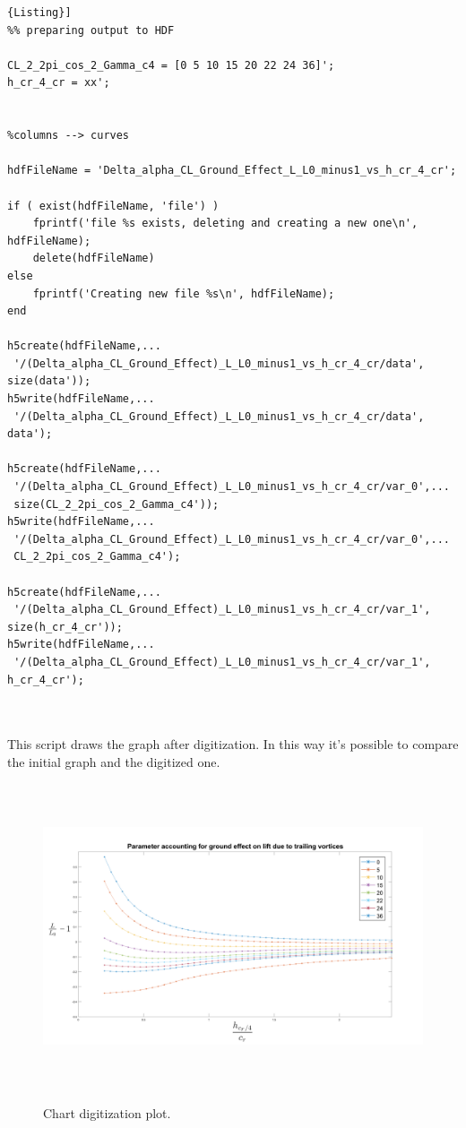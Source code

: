 \begin{lstlisting}[frame=rbl,caption={{\footnotesize MATLAB script for creating the HDF Database}},label= [style=\bfseries]{Listing}]
%% preparing output to HDF

CL_2_2pi_cos_2_Gamma_c4 = [0 5 10 15 20 22 24 36]';
h_cr_4_cr = xx';

 
%columns --> curves
 
hdfFileName = 'Delta_alpha_CL_Ground_Effect_L_L0_minus1_vs_h_cr_4_cr';

if ( exist(hdfFileName, 'file') )
    fprintf('file %s exists, deleting and creating a new one\n', hdfFileName);
    delete(hdfFileName)
else
    fprintf('Creating new file %s\n', hdfFileName);
end

h5create(hdfFileName,...
 '/(Delta_alpha_CL_Ground_Effect)_L_L0_minus1_vs_h_cr_4_cr/data', size(data'));
h5write(hdfFileName,...
 '/(Delta_alpha_CL_Ground_Effect)_L_L0_minus1_vs_h_cr_4_cr/data', data');

h5create(hdfFileName,...
 '/(Delta_alpha_CL_Ground_Effect)_L_L0_minus1_vs_h_cr_4_cr/var_0',...
 size(CL_2_2pi_cos_2_Gamma_c4'));
h5write(hdfFileName,...
 '/(Delta_alpha_CL_Ground_Effect)_L_L0_minus1_vs_h_cr_4_cr/var_0',...
 CL_2_2pi_cos_2_Gamma_c4');

h5create(hdfFileName,...
 '/(Delta_alpha_CL_Ground_Effect)_L_L0_minus1_vs_h_cr_4_cr/var_1', size(h_cr_4_cr'));
h5write(hdfFileName,...
 '/(Delta_alpha_CL_Ground_Effect)_L_L0_minus1_vs_h_cr_4_cr/var_1', h_cr_4_cr');
\end{lstlisting}

\noindent \\ \\ 
This script draws the graph after digitization. In this way it's possible to compare the initial graph and the digitized one.


 \begin{figure}[H]
\centering
{\includegraphics[height=9cm]{Immagini/AppendiceA/plotmatlab.png}} 
\caption{Chart digitization plot.}
\label{angles}
\end{figure} 

